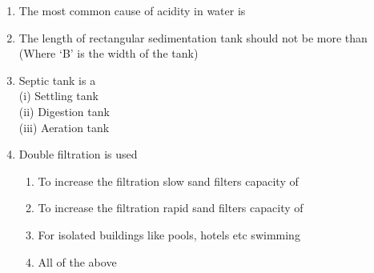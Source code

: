 \documentclass[11pt,a4paper]{article}
\begin{document}
\begin{enumerate}
\item{The most common cause of acidity in water is}
\\
\item{The length of rectangular sedimentation tank should not be more than \\
(Where `B' is the width of the tank)
}
\\
\item{Septic tank is a \\
 (i) Settling tank \\
 (ii) Digestion tank \\
 (iii) Aeration tank}
\\
\item{Double filtration is used}
\begin{enumerate}[label=\Alph*.]
\item{To increase the filtration slow sand filters capacity of}
\item{To increase the filtration rapid sand filters capacity of}
\item{For isolated buildings like pools, hotels etc swimming}
\item{All of the above}
\end{enumerate}
\end{enumerate}
\end{document}
